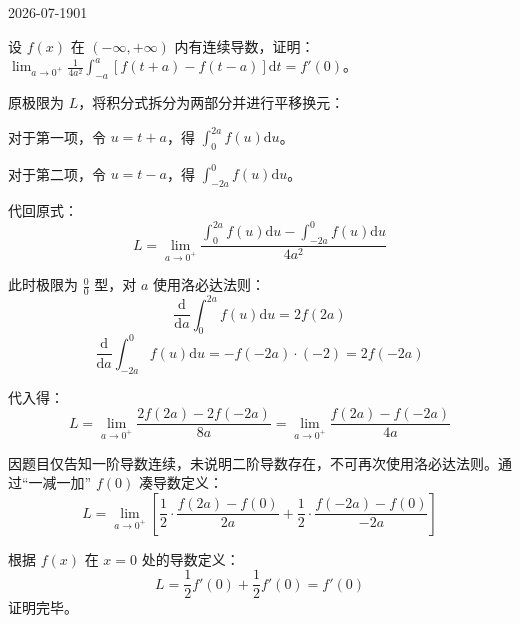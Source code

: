 \begin{mistake}{2026-07-19}{01}

\begin{problemcontent}
设 \(f(x)\) 在 \((-\infty, +\infty)\) 内有连续导数，证明：\(\lim_{a \to 0^+} \frac{1}{4a^2} \int_{-a}^{a} [f(t+a) - f(t-a)] \text{d}t = f'(0)\)。
\end{problemcontent}

\begin{solutioncontent}
原极限为 \(L\)，将积分式拆分为两部分并进行平移换元：

对于第一项，令 \(u = t+a\)，得 \(\int_{0}^{2a} f(u) \text{d}u\)。

对于第二项，令 \(u = t-a\)，得 \(\int_{-2a}^{0} f(u) \text{d}u\)。

代回原式：
\[ L = \lim_{a \to 0^+} \frac{\int_{0}^{2a} f(u) \text{d}u - \int_{-2a}^{0} f(u) \text{d}u}{4a^2} \]

此时极限为 \(\frac{0}{0}\) 型，对 \(a\) 使用洛必达法则：
\[ \frac{\text{d}}{\text{d}a} \int_{0}^{2a} f(u) \text{d}u = 2f(2a) \]
\[ \frac{\text{d}}{\text{d}a} \int_{-2a}^{0} f(u) \text{d}u = -f(-2a) \cdot (-2) = 2f(-2a) \]

代入得：
\[ L = \lim_{a \to 0^+} \frac{2f(2a) - 2f(-2a)}{8a} = \lim_{a \to 0^+} \frac{f(2a) - f(-2a)}{4a} \]

因题目仅告知一阶导数连续，未说明二阶导数存在，不可再次使用洛必达法则。通过“一减一加” \(f(0)\) 凑导数定义：
\[ L = \lim_{a \to 0^+} \left[ \frac{1}{2} \cdot \frac{f(2a) - f(0)}{2a} + \frac{1}{2} \cdot \frac{f(-2a) - f(0)}{-2a} \right] \]

根据 \(f(x)\) 在 \(x=0\) 处的导数定义：
\[ L = \frac{1}{2} f'(0) + \frac{1}{2} f'(0) = f'(0) \]
证明完毕。
\end{solutioncontent}


\end{mistake}
